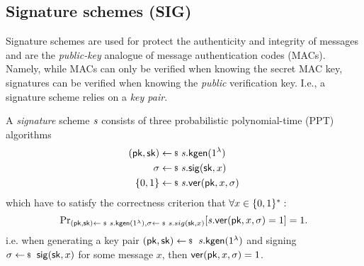 \newpage
\subsection{Signature schemes (SIG)}
Signature schemes are used for protect the authenticity and integrity of messages and are the \emph{public-key} analogue of message authentication codes (MACs). Namely, while MACs can only be verified when knowing the secret MAC key, signatures can be verified when knowing the \emph{public} verification key. I.e., a signature scheme relies on a \emph{key pair}.

\begin{syntax}
    A \emph{signature} scheme $\mathit{{s}}$ consists of three probabilistic polynomial-time (PPT) algorithms
    \begin{align*} 
      (\pk,\sk)\sample&\s.\kgen(1^\lambda) \\
      \sigma\sample&\s.\sig(\sk,x) \\
      \bin \sample &\s.\ver(\pk,x,\sigma)
    \end{align*}
    which have to satisfy the correctness criterion that $\forall x\in\{0,1\}^*:$
      \[\probsub{(\pk,\sk)\sample\s.\kgen(1^\lambda),\sigma\sample\s.sig(\sk,x)}{\s.\ver(\pk,x,\sigma)=1}=1.\]
    i.e. when generating a key pair $(\pk,\sk)\sample\s.\kgen(1^\lambda)$ and signing $\sigma\sample\sig(\sk,x)$ for some message $x$, then $\ver(\pk,x,\sigma)=1$.
\end{syntax}

